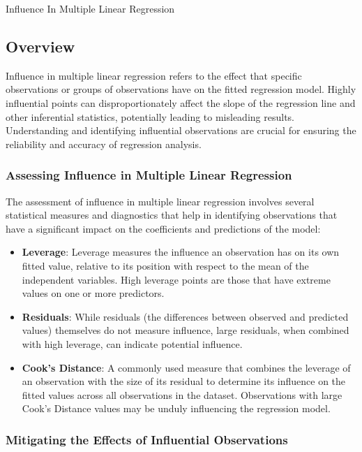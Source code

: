 \begin{notes}{Influence In Multiple Linear Regression}
    \subsection*{Overview}

    Influence in multiple linear regression refers to the effect that specific observations or groups of observations have on the fitted regression model. Highly influential points can disproportionately 
    affect the slope of the regression line and other inferential statistics, potentially leading to misleading results. Understanding and identifying influential observations are crucial for ensuring 
    the reliability and accuracy of regression analysis. \vspace*{1em}
    
    \subsubsection*{Assessing Influence in Multiple Linear Regression}
    
    The assessment of influence in multiple linear regression involves several statistical measures and diagnostics that help in identifying observations that have a significant impact on the coefficients 
    and predictions of the model:
    
    \begin{itemize}
        \item \textbf{Leverage}: Leverage measures the influence an observation has on its own fitted value, relative to its position with respect to the mean of the independent variables. High leverage 
        points are those that have extreme values on one or more predictors.
        \item \textbf{Residuals}: While residuals (the differences between observed and predicted values) themselves do not measure influence, large residuals, when combined with high leverage, can 
        indicate potential influence.
        \item \textbf{Cook's Distance}: A commonly used measure that combines the leverage of an observation with the size of its residual to determine its influence on the fitted values across all 
        observations in the dataset. Observations with large Cook's Distance values may be unduly influencing the regression model.
    \end{itemize}
    
    \subsubsection*{Mitigating the Effects of Influential Observations}
    

\end{notes}
